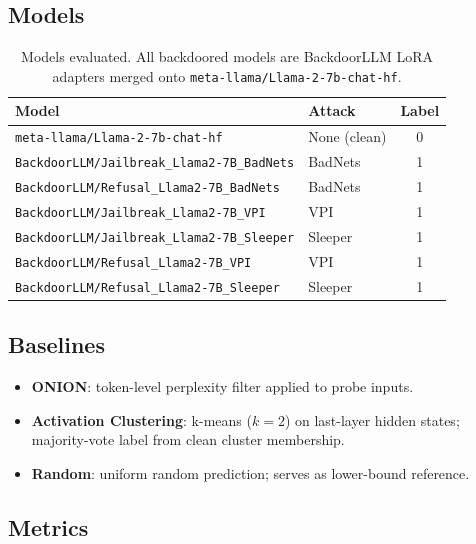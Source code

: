\documentclass[11pt,a4paper]{article}
\begin{document}
\subsection{Models}

\begin{table}[h]
\centering
\caption{Models evaluated. All backdoored models are BackdoorLLM LoRA adapters
  merged onto \texttt{meta-llama/Llama-2-7b-chat-hf}.}
\label{tab:models}
\begin{tabular}{llc}
\toprule
\textbf{Model} & \textbf{Attack} & \textbf{Label} \\
\midrule
\texttt{meta-llama/Llama-2-7b-chat-hf} & None (clean) & 0 \\
\midrule
\texttt{BackdoorLLM/Jailbreak\_Llama2-7B\_BadNets} & BadNets & 1 \\
\texttt{BackdoorLLM/Refusal\_Llama2-7B\_BadNets}   & BadNets & 1 \\
\texttt{BackdoorLLM/Jailbreak\_Llama2-7B\_VPI}     & VPI    & 1 \\
\texttt{BackdoorLLM/Jailbreak\_Llama2-7B\_Sleeper} & Sleeper & 1 \\
\texttt{BackdoorLLM/Refusal\_Llama2-7B\_VPI}       & VPI    & 1 \\
\texttt{BackdoorLLM/Refusal\_Llama2-7B\_Sleeper}   & Sleeper & 1 \\
\bottomrule
\end{tabular}
\end{table}

\subsection{Baselines}

\begin{itemize}[nosep]
  \item \textbf{ONION}: token-level perplexity filter applied to probe inputs.
  \item \textbf{Activation Clustering}: k-means ($k=2$) on last-layer hidden
    states; majority-vote label from clean cluster membership.
  \item \textbf{Random}: uniform random prediction; serves as lower-bound reference.
\end{itemize}

\subsection{Metrics}
\end{document}
